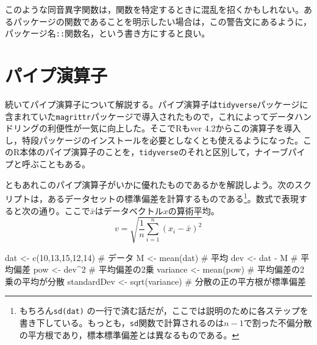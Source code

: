 \documentclass[
  a4paper,
]{ltjsbook}
\newenvironment{Shaded}{\begin{snugshade}}{\end{snugshade}}
\newcommand{\CommentTok}[1]{\textcolor[rgb]{0.37,0.37,0.37}{#1}}
\newcommand{\DecValTok}[1]{\textcolor[rgb]{0.68,0.00,0.00}{#1}}
\newcommand{\FunctionTok}[1]{\textcolor[rgb]{0.28,0.35,0.67}{#1}}
\newcommand{\NormalTok}[1]{\textcolor[rgb]{0.00,0.23,0.31}{#1}}
\newcommand{\OtherTok}[1]{\textcolor[rgb]{0.00,0.23,0.31}{#1}}
\newcommand{\SpecialCharTok}[1]{\textcolor[rgb]{0.37,0.37,0.37}{#1}}
\begin{document}
このような同音異字関数は，関数を特定するときに混乱を招くかもしれない。あるパッケージの関数であることを明示したい場合は，この警告文にあるように，パッケージ名\texttt{::}関数名，という書き方にすると良い。

\section{パイプ演算子}\label{ux30d1ux30a4ux30d7ux6f14ux7b97ux5b50}

続いてパイプ演算子について解説する。パイプ演算子は\texttt{tidyverse}パッケージに含まれていた\texttt{magrittr}パッケージで導入されたもので，これによってデータハンドリングの利便性が一気に向上した。そこでRもver
4.2からこの演算子を導入し，特段パッケージのインストールを必要としなくとも使えるようになった。このR本体のパイプ演算子のことを，\texttt{tidyverse}のそれと区別して，ナイーブパイプと呼ぶこともある。

ともあれこのパイプ演算子がいかに優れたものであるかを解説しよう。次のスクリプトは，あるデータセットの標準偏差を計算するものである\footnote{もちろん\texttt{sd(dat)}
  の一行で済む話だが，ここでは説明のために各ステップを書き下している。もっとも，\texttt{sd}関数で計算されるのは\(n-1\)で割った不偏分散の平方根であり，標本標準偏差とは異なるものである。}。数式で表現すると次の通り。ここで\(\bar{x}\)はデータベクトル\(x\)の算術平均。
\[v = \sqrt{\frac{1}{n}\sum_{i=1}^n (x_i - \bar{x})^2}\]

\begin{Shaded}
\begin{Highlighting}[]
\NormalTok{dat }\OtherTok{\textless{}{-}} \FunctionTok{c}\NormalTok{(}\DecValTok{10}\NormalTok{,}\DecValTok{13}\NormalTok{,}\DecValTok{15}\NormalTok{,}\DecValTok{12}\NormalTok{,}\DecValTok{14}\NormalTok{) }\CommentTok{\# データ}
\NormalTok{M }\OtherTok{\textless{}{-}} \FunctionTok{mean}\NormalTok{(dat)           }\CommentTok{\# 平均}
\NormalTok{dev }\OtherTok{\textless{}{-}}\NormalTok{ dat }\SpecialCharTok{{-}}\NormalTok{ M           }\CommentTok{\# 平均偏差}
\NormalTok{pow }\OtherTok{\textless{}{-}}\NormalTok{ dev}\SpecialCharTok{\^{}}\DecValTok{2}             \CommentTok{\# 平均偏差の2乗}
\NormalTok{variance }\OtherTok{\textless{}{-}} \FunctionTok{mean}\NormalTok{(pow)    }\CommentTok{\# 平均偏差の2乗の平均が分散}
\NormalTok{standardDev }\OtherTok{\textless{}{-}} \FunctionTok{sqrt}\NormalTok{(variance) }\CommentTok{\# 分散の正の平方根が標準偏差}
\end{Highlighting}
\end{Shaded}
\end{document}
